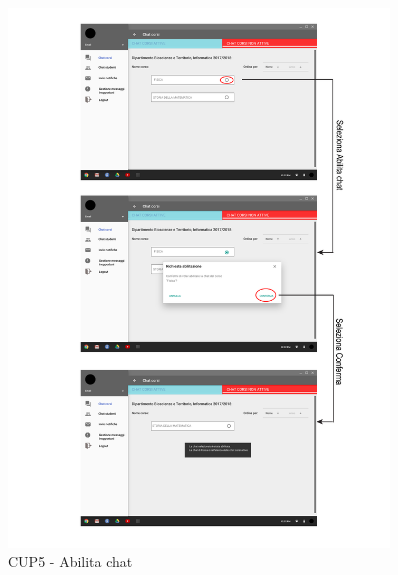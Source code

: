 \begin{figure}
	\centering
	\includegraphics[width=0.9\textwidth]{imgs/gruppo6/activities/act_cup5_abilita_chat.pdf}
	\caption{CUP5 - Abilita chat}
	\label{fig:act-cup5}
\end{figure}

